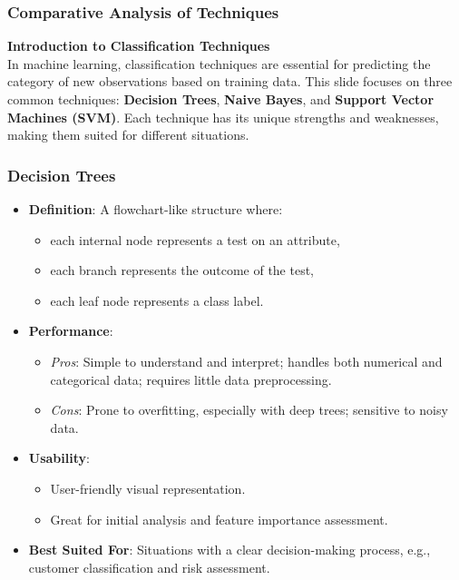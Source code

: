 \documentclass[aspectratio=169]{beamer}
\begin{document}
\begin{frame}[fragile]
    \frametitle{Comparative Analysis of Techniques}
    \textbf{Introduction to Classification Techniques} \\
    In machine learning, classification techniques are essential for predicting the category of new observations based on training data. This slide focuses on three common techniques: \textbf{Decision Trees}, \textbf{Naive Bayes}, and \textbf{Support Vector Machines (SVM)}. Each technique has its unique strengths and weaknesses, making them suited for different situations.
\end{frame}

\begin{frame}[fragile]
    \frametitle{Decision Trees}
    \begin{itemize}
        \item \textbf{Definition}: A flowchart-like structure where:
            \begin{itemize}
                \item each internal node represents a test on an attribute,
                \item each branch represents the outcome of the test,
                \item each leaf node represents a class label.
            \end{itemize}
        \item \textbf{Performance}:
            \begin{itemize}
                \item \textit{Pros}: Simple to understand and interpret; handles both numerical and categorical data; requires little data preprocessing.
                \item \textit{Cons}: Prone to overfitting, especially with deep trees; sensitive to noisy data.
            \end{itemize}
        \item \textbf{Usability}: 
            \begin{itemize}
                \item User-friendly visual representation.
                \item Great for initial analysis and feature importance assessment.
            \end{itemize}
        \item \textbf{Best Suited For}: Situations with a clear decision-making process, e.g., customer classification and risk assessment.
    \end{itemize}
\end{frame}
\end{document}
